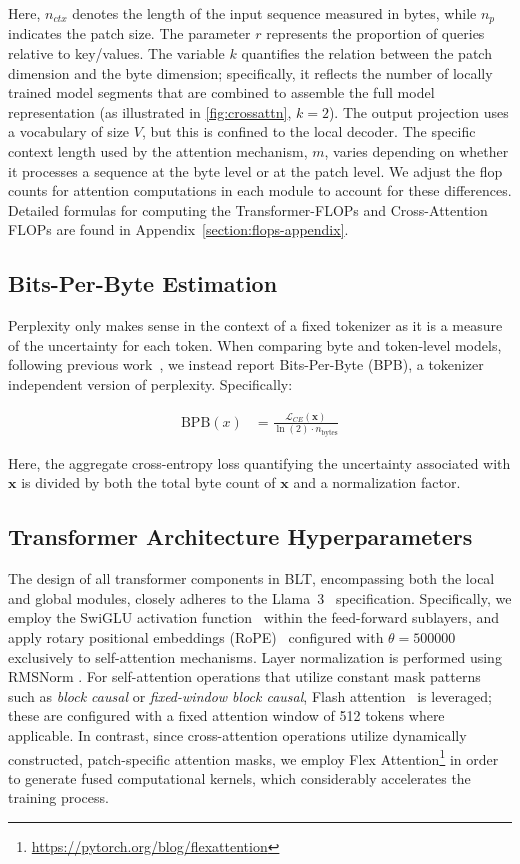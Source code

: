 Here, $n_{ctx}$ denotes the length of the input sequence measured in bytes, while $n_p$ indicates the patch size. The parameter $r$ represents the proportion of queries relative to key/values. The variable $k$ quantifies the relation between the patch dimension and the byte dimension; specifically, it reflects the number of locally trained model segments that are combined to assemble the full model representation (as illustrated in \autoref{fig:crossattn}, $k=2$). The output projection uses a vocabulary of size $V$, but this is confined to the local decoder. The specific context length used by the attention mechanism, $m$, varies depending on whether it processes a sequence at the byte level or at the patch level. We adjust the flop counts for attention computations in each module to account for these differences. Detailed formulas for computing the Transformer-FLOPs and Cross-Attention FLOPs are found in Appendix~\ref{section:flops-appendix}.

\subsection{Bits-Per-Byte Estimation} Perplexity only makes sense in the context of a fixed tokenizer as it is a measure of the uncertainty for each token. When comparing byte and token-level models, following previous work~\citep{xue2022byt5, yu2023megabyte, wang2024mambabyte}, we instead report Bits-Per-Byte (BPB), a tokenizer independent version of perplexity. Specifically:

\begin{align}
    \text{BPB}(x)&= \frac{\mathcal{L}_{CE}(\pmb{x})}{\ln(2)\cdot n_{\text{bytes}}}
\end{align}

Here, the aggregate cross-entropy loss quantifying the uncertainty associated with $\pmb{x}$ is divided by both the total byte count of $\pmb{x}$ and a normalization factor.

\subsection{Transformer Architecture Hyperparameters} The design of all transformer components in {\textsc BLT}, encompassing both the local and global modules, closely adheres to the Llama~3~\citep{dubey2024llama} specification. Specifically, we employ the SwiGLU activation function~\citep{swiglu} within the feed-forward sublayers, and apply rotary positional embeddings (RoPE)~\citep{RoPe} configured with $\theta=500000$~\citep{xiong2024effective} exclusively to self-attention mechanisms. Layer normalization is performed using RMSNorm \citep{RMSNorm}. For self-attention operations that utilize constant mask patterns such as \textit{block causal} or \textit{fixed-window block causal}, Flash attention~\citep{dao2022flashattention} is leveraged; these are configured with a fixed attention window of 512 tokens where applicable. In contrast, since cross-attention operations utilize dynamically constructed, patch-specific attention masks, we employ Flex Attention\footnote{\url{https://pytorch.org/blog/flexattention}} in order to generate fused computational kernels, which considerably accelerates the training process.

